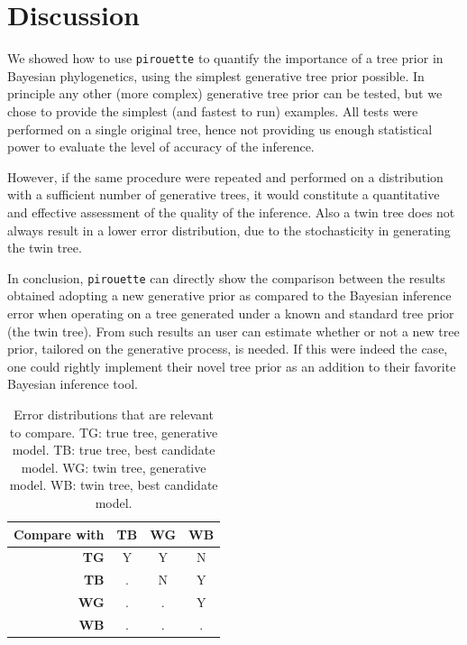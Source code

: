 \section{Discussion}

We showed how to use \verb;pirouette; to quantify the importance of a tree prior in Bayesian phylogenetics, using the simplest generative tree prior possible.
In principle any other (more complex) generative tree prior can be tested, but we chose to provide the simplest (and fastest to run) examples.
All tests were performed on a single original tree, 
hence not providing us enough statistical power to 
evaluate the level of accuracy of the inference. 

However, if the same procedure were repeated and performed on a distribution with a sufficient number of generative trees, 
it would constitute a quantitative and effective assessment of the quality of the inference.
Also a twin tree does not always result in a lower error distribution,
due to the stochasticity in generating the twin tree.

In conclusion, \verb;pirouette; can directly show the comparison between the results obtained 
adopting a new generative prior as compared to the Bayesian inference error
when operating on a tree generated under a known and standard tree 
prior (the twin tree).
From such results an user can estimate whether or not a new tree prior, 
tailored on the generative process, is needed. 
If this were indeed the case, one could rightly implement their novel tree prior as an addition to 
their favorite Bayesian inference tool.

\begin{table}
  \begin{tabular}{ | r | c | c | c | }
    \hline
    \textbf{Compare with} & \textbf{TB} & \textbf{WG} & \textbf{WB} \\ 
    \hline
    \textbf{TG} & Y & Y & N \\
    \textbf{TB} & . & N & Y \\
    \textbf{WG} & . & . & Y \\
    \textbf{WB} & . & . & . \\
    \hline
  \end{tabular}
  \caption{
    Error distributions that are relevant to compare.
    TG: true tree, generative model.
    TB: true tree, best candidate model.
    WG: twin tree, generative model.
    WB: twin tree, best candidate model.
  }
  \label{tab:relevant_comparisions}
\end{table}

